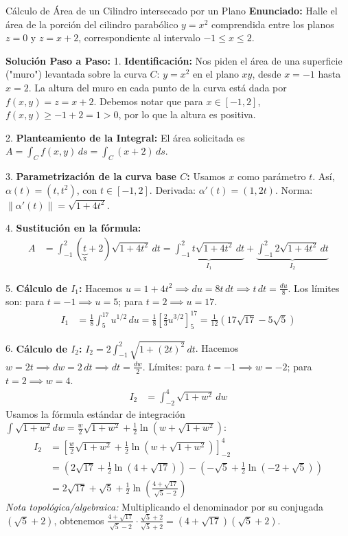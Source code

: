\documentclass[11pt,a4paper]{article}
\begin{document}
\begin{ejerciciobox}{Cálculo de Área de un Cilindro intersecado por un Plano}
\textbf{Enunciado:} Halle el área de la porción del cilindro parabólico $y = x^2$ comprendida entre los planos $z=0$ y $z=x+2$, correspondiente al intervalo $-1 \le x \le 2$.

\textbf{Solución Paso a Paso:}
1. \textbf{Identificación:} Nos piden el área de una superficie ("muro") levantada sobre la curva $C$: $y = x^2$ en el plano $xy$, desde $x=-1$ hasta $x=2$.
La altura del muro en cada punto de la curva está dada por $f(x,y) = z = x+2$. Debemos notar que para $x \in [-1, 2]$, $f(x,y) \ge -1+2 = 1 > 0$, por lo que la altura es positiva.

2. \textbf{Planteamiento de la Integral:} El área solicitada es $A = \int_C f(x,y) \, ds = \int_C (x+2) \, ds$.

3. \textbf{Parametrización de la curva base $C$:}
Usamos $x$ como parámetro $t$. Así, $\alpha(t) = (t, t^2)$, con $t \in [-1, 2]$.
Derivada: $\alpha'(t) = (1, 2t)$.
Norma: $\|\alpha'(t)\| = \sqrt{1 + 4t^2}$.

4. \textbf{Sustitución en la fórmula:}
\begin{align*}
A &= \int_{-1}^2 (\underbrace{t}_{\text{x}} + 2) \sqrt{1 + 4t^2} \, dt = \underbrace{\int_{-1}^2 t \sqrt{1 + 4t^2} \, dt}_{I_1} + \underbrace{\int_{-1}^2 2\sqrt{1 + 4t^2} \, dt}_{I_2}
\end{align*}

5. \textbf{Cálculo de $I_1$:}
Hacemos $u = 1+4t^2 \implies du = 8t\, dt \implies t\, dt = \frac{du}{8}$.
Los límites son: para $t=-1 \implies u=5$; para $t=2 \implies u=17$.
\begin{align*}
I_1 &= \frac{1}{8} \int_5^{17} u^{1/2} \, du = \frac{1}{8} \left[ \frac{2}{3} u^{3/2} \right]_5^{17} = \frac{1}{12} \left( 17\sqrt{17} - 5\sqrt{5} \right)
\end{align*}

6. \textbf{Cálculo de $I_2$:}
$I_2 = 2 \int_{-1}^2 \sqrt{1 + (2t)^2} \, dt$. Hacemos $w = 2t \implies dw = 2\, dt \implies dt = \frac{dw}{2}$.
Límites: para $t=-1 \implies w=-2$; para $t=2 \implies w=4$.
\begin{align*}
I_2 &= \int_{-2}^4 \sqrt{1 + w^2} \, dw
\end{align*}
Usamos la fórmula estándar de integración $\int \sqrt{1+w^2}dw = \frac{w}{2}\sqrt{1+w^2} + \frac{1}{2}\ln(w + \sqrt{1+w^2})$:
\begin{align*}
I_2 &= \left[ \frac{w}{2}\sqrt{1+w^2} + \frac{1}{2}\ln(w + \sqrt{1+w^2}) \right]_{-2}^4 \\
&= \left( 2\sqrt{17} + \frac{1}{2}\ln(4+\sqrt{17}) \right) - \left( -\sqrt{5} + \frac{1}{2}\ln(-2+\sqrt{5}) \right) \\
&= 2\sqrt{17} + \sqrt{5} + \frac{1}{2}\ln\left( \frac{4+\sqrt{17}}{\sqrt{5}-2} \right)
\end{align*}
\textit{Nota topológica/algebraica:} Multiplicando el denominador por su conjugada $(\sqrt{5}+2)$, obtenemos $\frac{4+\sqrt{17}}{\sqrt{5}-2} \cdot \frac{\sqrt{5}+2}{\sqrt{5}+2} = (4+\sqrt{17})(\sqrt{5}+2)$.


\end{ejerciciobox}
\end{document}
